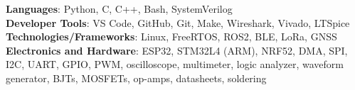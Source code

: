 \begin{itemize}[leftmargin=0.15in, label={}]
    \small{\item{
     \textbf{Languages}{: Python, C, C++, Bash, SystemVerilog} \\
     \textbf{Developer Tools}{: VS Code, GitHub, Git, Make, Wireshark, Vivado, LTSpice} \\
     \textbf{Technologies/Frameworks}{: Linux, FreeRTOS, ROS2, BLE, LoRa, GNSS} \\
     \textbf{Electronics and Hardware}{: ESP32, STM32L4 (ARM), NRF52, DMA, SPI, I2C, UART, GPIO, PWM, oscilloscope, multimeter, logic analyzer, waveform generator, BJTs, MOSFETs, op-amps, datasheets, soldering} \\
    }}
 \end{itemize}
